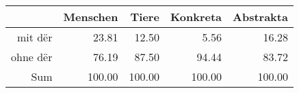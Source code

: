 \begin{tabular}{rrrrr}
  \hline
 & Menschen & Tiere & Konkreta & Abstrakta \\ 
  \hline
mit dër & 23.81 & 12.50 & 5.56 & 16.28 \\ 
  ohne dër & 76.19 & 87.50 & 94.44 & 83.72 \\ 
  Sum & 100.00 & 100.00 & 100.00 & 100.00 \\ 
   \hline
\end{tabular}
